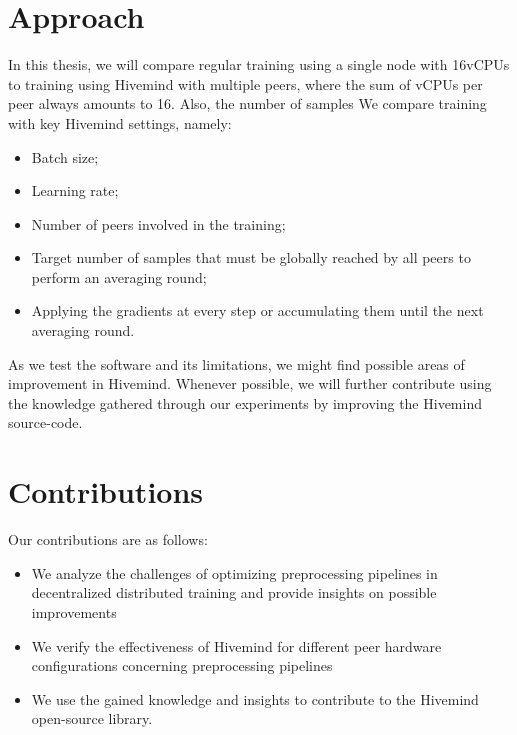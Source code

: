 \section{Approach}

In this thesis, we will compare regular training using a single node with 16vCPUs to training using Hivemind with multiple peers, where the sum of vCPUs per peer always amounts to 16.
Also, the number of samples 
We compare training with key Hivemind settings, namely:
\begin{itemize}
    \item Batch size;
    \item Learning rate;
    \item Number of peers involved in the training;
    \item Target number of samples that must be globally reached by all peers to perform an averaging round;
    \item Applying the gradients at every step or accumulating them until the next averaging round.
\end{itemize}

As we test the software and its limitations, we might find possible areas of improvement in Hivemind.
Whenever possible, we will further contribute using the knowledge gathered through our experiments by improving the Hivemind \cite{hivemind} source-code.

\section{Contributions}

Our contributions are as follows:
\begin{itemize}
    \item We analyze the challenges of optimizing preprocessing pipelines in decentralized distributed training and provide insights on possible improvements
    \item We verify the effectiveness of Hivemind for different peer hardware configurations concerning preprocessing pipelines
    \item We use the gained knowledge and insights to contribute to the Hivemind open-source library.
\end{itemize}
